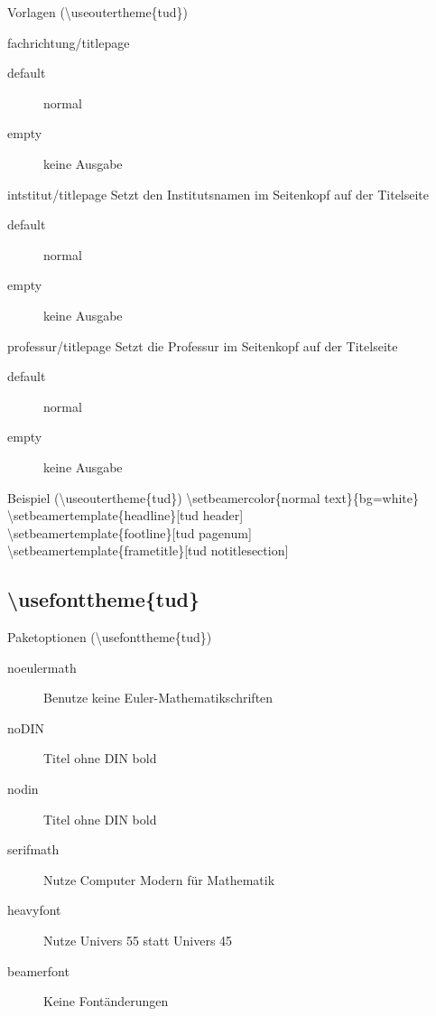 \documentclass[presentation,t]{beamer}
\begin{document}
\begin{frame}[allowframebreaks]{Vorlagen (\textbackslash useoutertheme\{tud\})}
\begin{block}{fachrichtung/titlepage}
\begin{description}
\item[{default}] normal
\item[{empty}] keine Ausgabe
\end{description}
\end{block}
\begin{block}{intstitut/titlepage}
Setzt den Institutsnamen im Seitenkopf auf der Titelseite

\begin{description}
\item[{default}] normal
\item[{empty}] keine Ausgabe
\end{description}
\end{block}

\begin{block}{professur/titlepage}
Setzt die Professur im Seitenkopf auf der Titelseite

\begin{description}
\item[{default}] normal
\item[{empty}] keine Ausgabe
\end{description}
\end{block}
\end{frame}

\begin{frame}[label={sec:orgb96a3ab}]{Beispiel (\textbackslash useoutertheme\{tud\})}
\textbackslash setbeamercolor\{normal text\}\{bg=white\}\\
\textbackslash setbeamertemplate\{headline\}[tud header]\\
\textbackslash setbeamertemplate\{footline\}[tud pagenum]\\
\textbackslash setbeamertemplate\{frametitle\}[tud notitlesection]\\
\end{frame}


\subsection{\textbackslash usefonttheme\{tud\}}
\label{sec:orgd950251}

\begin{frame}[label={sec:orga38f525}]{Paketoptionen (\textbackslash usefonttheme\{tud\})}
\begin{description}
\item[{noeulermath}] Benutze keine Euler-Mathematikschriften
\item[{noDIN}] Titel ohne DIN bold
\item[{nodin}] Titel ohne DIN bold
\item[{serifmath}] Nutze Computer Modern für Mathematik
\item[{heavyfont}] Nutze Univers 55 statt Univers 45
\item[{beamerfont}] Keine Fontänderungen
\end{description}
\end{frame}
\end{document}
